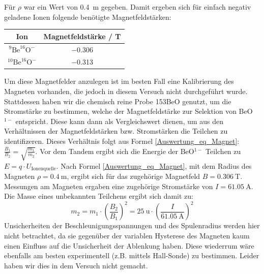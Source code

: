 Für $\rho$ war ein Wert von \SI{0.4}{\metre} gegeben.
Damit ergeben sich für einfach negativ geladene Ionen folgende benötigte Magnetfeldstärken:
\begin{center}
  \begin{tabular}{|c|c|}
    \hline
    Ion & Magnetfeldstärke / \si{\tesla} \\
    \hline
    $^{9}\text{Be}^{16}\text{O}^{-}$ & \num{-0.306} \\
    \hline
    $^{10}\text{Be}^{16}\text{O}^{-}$ & \num{-0.313} \\
    \hline
  \end{tabular}
  \label{Auswertung_tab_Ionenenergien_vor_Besch}
\end{center}
Um diese Magnetfelder anzulegen ist im besten Fall eine Kalibrierung des Magneten vorhanden, die jedoch in diesem Versuch nicht durchgeführt wurde.
Stattdessen haben wir die chemisch reine Probe 153BeO genutzt, um die Stromstärke zu bestimmen, welche der Magnetfeldstärke zur Selektion von BeO$^{1-}$ entspricht.
Diese kann dann als Vergleichswert dienen, um aus den Verhältnissen der Magnetfeldstärken bzw. Stromstärken die Teilchen zu identifizeren.
Dieses Verhältnis folgt aus Formel \ref{Auswertung_eq_Magnet}: $\frac{B_1}{B_2} = \sqrt{\frac{m_1}{m_2}}$.
Vor dem Tandem ergibt sich die Energie der BeO$^{1-}$ Teilchen zu $E = q \cdot U_{\text{Ionenquelle}}$.
Nach Formel \ref{Auswertung_eq_Magnet}, mit dem Radius des Magneten $\rho = \SI{0.4}{\metre}$, ergibt sich für das zugehörige Magnetfeld $B = \SI{0.306}{\tesla}$.
Messungen am Magneten ergaben eine zugehörige Stromstärke von $I = \SI{61.05}{\ampere}$.
Die Masse eines unbekannten Teilchens ergibt sich damit zu:
\begin{equation}
    m_2 = m_1 \cdot \left( \frac{B_2}{B_1} \right)^{2} = \SI{25}{\atomicmassunit} \cdot \left (\frac{I}{\SI{61.05}{\ampere}}\right )^{2}
    \label{Auswertung_LE_masse}
\end{equation}
Unsicherheiten der Beschleunigungsspannungen und des Spulenradius werden hier nicht betrachtet, da sie gegenüber der variablen Hysterese des Magneten kaum einen Einfluss auf die Unsicherheit der Ablenkung haben.
Diese wiederrum wäre ebenfalls am besten experimentell (z.B. mittels Hall-Sonde) zu bestimmen.
Leider haben wir dies in dem Versuch nicht gemacht.

